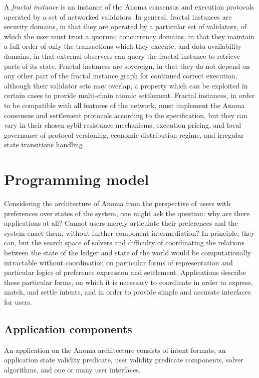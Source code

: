 A \emph{fractal instance} is an instance of the Anoma consensus and
execution protocols operated by a set of networked validators. In
general, fractal instances are security domains, in that they are
operated by a particular set of validators, of which the user must trust
a quorum; concurrency domains, in that they maintain a full order of
only the transactions which they execute; and data availability domains,
in that external observers can query the fractal instance to retrieve
parts of its state. Fractal instances are sovereign, in that they do not
depend on any other part of the fractal instance graph for continued
correct execution, although their validator sets may overlap, a property
which can be exploited in certain cases to provide multi-chain atomic
settlement. Fractal instances, in order to be compatible with all
features of the network, must implement the Anoma consensus and
settlement protocols according to the specification, but they can vary
in their chosen sybil-resistance mechanisms, execution pricing, and
local governance of protocol versioning, economic distribution regime,
and irregular state transitions handling.

\section{Programming model}\label{programming-model}

Considering the architecture of Anoma from the perspective of users with
preferences over states of the system, one might ask the question: why
are there applications at all? Cannot users merely articulate their
preferences and the system enact them, without further component
intermediation? In principle, they can, but the search space of solvers
and difficulty of coordinating the relations between the state of the
ledger and state of the world would be computationally intractable
without coordination on particular forms of representation and
particular logics of preference expression and settlement. Applications
describe these particular forms, on which it is necessary to coordinate
in order to express, match, and settle intents, and in order to provide
simple and accurate interfaces for users.

\subsection{Application components}\label{application-components}

An application on the Anoma architecture consists of intent formats, an
application state validity predicate, user validity predicate
components, solver algorithms, and one or many user interfaces.


